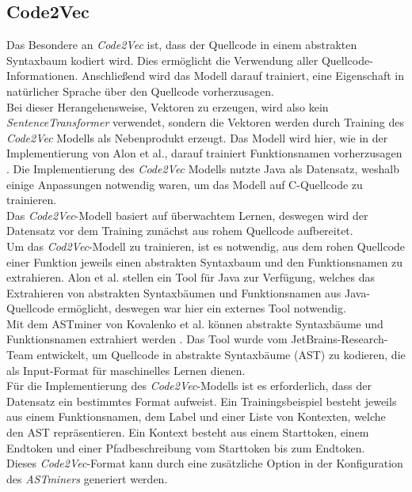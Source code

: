 \documentclass[12pt,letterpaper,ngerman]{article}
\begin{document}
\subsection{Code2Vec}
Das Besondere an \textit{Code2Vec} ist, dass der Quellcode in einem
abstrakten Syntaxbaum kodiert wird. Dies ermöglicht die Verwendung 
aller
Quellcode-Informationen. Anschließend wird
das Modell darauf trainiert, eine Eigenschaft in natürlicher Sprache
über den Quellcode vorherzusagen.\\
Bei dieser Herangehensweise, Vektoren zu erzeugen, wird
also kein \textit{SentenceTransformer}
verwendet, sondern die Vektoren werden durch Training des
\textit{Code2Vec} Modells als Nebenprodukt erzeugt. 
Das Modell wird hier, wie in der Implementierung von 
Alon et al., darauf trainiert Funktionsnamen vorherzusagen
\cite{code2vec}.
Die Implementierung des \textit{Code2Vec} Modells
nutzte Java als Datensatz, weshalb einige Anpassungen
notwendig waren,
um das Modell auf C-Quellcode zu trainieren.\\
Das \textit{Code2Vec}-Modell basiert auf überwachtem Lernen,
deswegen wird der Datensatz vor dem Training zunächst aus
rohem Quellcode aufbereitet.\\
Um das \textit{Cod2Vec}-Modell zu trainieren,
ist es notwendig,
aus dem rohen Quellcode einer Funktion jeweils einen abstrakten 
Syntaxbaum und den
Funktionsnamen zu extrahieren. Alon et al. stellen ein Tool 
für Java zur Verfügung, welches das Extrahieren von abstrakten 
Syntaxbäumen und Funktionsnamen aus Java-Quellcode ermöglicht, 
deswegen war hier ein externes Tool notwendig.\\
Mit dem ASTminer von Kovalenko et al. können abstrakte Syntaxbäume
und Funktionsnamen extrahiert werden \cite{kovalenko2019pathminer}. 
Das Tool wurde vom JetBrains-Research-Team entwickelt, um Quellcode
in abstrakte Syntaxbäume (AST) zu 
kodieren, die als Input-Format für maschinelles Lernen dienen.\\ 
Für die Implementierung des \textit{Code2Vec}-Modells ist es 
erforderlich, dass der Datensatz ein bestimmtes Format aufweist.
Ein Trainingsbeispiel besteht jeweils aus einem 
Funktionsnamen, dem Label und einer Liste von Kontexten, welche den AST 
repräsentieren. Ein Kontext besteht aus einem Starttoken, einem Endtoken 
und einer Pfadbeschreibung vom Starttoken bis zum Endtoken.\\
Dieses \textit{Code2Vec}-Format kann durch eine zusätzliche Option
in der Konfiguration des \textit{ASTminers} generiert werden.
\end{document}
